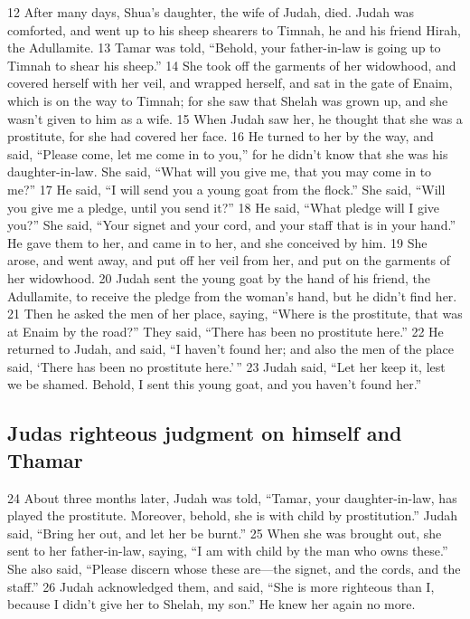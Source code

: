 {12} After many days, Shua's daughter, the wife of Judah, died. Judah
was comforted, and went up to his sheep shearers to Timnah, he and his
friend Hirah, the Adullamite. {13} Tamar was told, ``Behold, your
father-in-law is going up to Timnah to shear his sheep.'' {14} She took
off the garments of her widowhood, and covered herself with her veil,
and wrapped herself, and sat in the gate of Enaim, which is on the way
to Timnah; for she saw that Shelah was grown up, and she wasn't given to
him as a wife. {15} When Judah saw her, he thought that she was a
prostitute, for she had covered her face. {16} He turned to her by the
way, and said, ``Please come, let me come in to you,'' for he didn't
know that she was his daughter-in-law. She said, ``What will you give
me, that you may come in to me?'' {17} He said, ``I will send you a
young goat from the flock.'' She said, ``Will you give me a pledge,
until you send it?'' {18} He said, ``What pledge will I give you?'' She
said, ``Your signet and your cord, and your staff that is in your
hand.'' He gave them to her, and came in to her, and she conceived by
him. {19} She arose, and went away, and put off her veil from her, and
put on the garments of her widowhood. {20} Judah sent the young goat by
the hand of his friend, the Adullamite, to receive the pledge from the
woman's hand, but he didn't find her. {21} Then he asked the men of her
place, saying, ``Where is the prostitute, that was at Enaim by the
road?'' They said, ``There has been no prostitute here.'' {22} He
returned to Judah, and said, ``I haven't found her; and also the men of
the place said, `There has been no prostitute here.'\,'' {23} Judah
said, ``Let her keep it, lest we be shamed. Behold, I sent this young
goat, and you haven't found her.''

\hypertarget{judas-righteous-judgment-on-himself-and-thamar}{%
\subsection{Judas righteous judgment on himself and
Thamar}\label{judas-righteous-judgment-on-himself-and-thamar}}

{24} About three months later, Judah was told, ``Tamar, your
daughter-in-law, has played the prostitute. Moreover, behold, she is
with child by prostitution.'' Judah said, ``Bring her out, and let her
be burnt.'' {25} When she was brought out, she sent to her
father-in-law, saying, ``I am with child by the man who owns these.''
She also said, ``Please discern whose these are---the signet, and the
cords, and the staff.'' {26} Judah acknowledged them, and said, ``She is
more righteous than I, because I didn't give her to Shelah, my son.'' He
knew her again no more.


